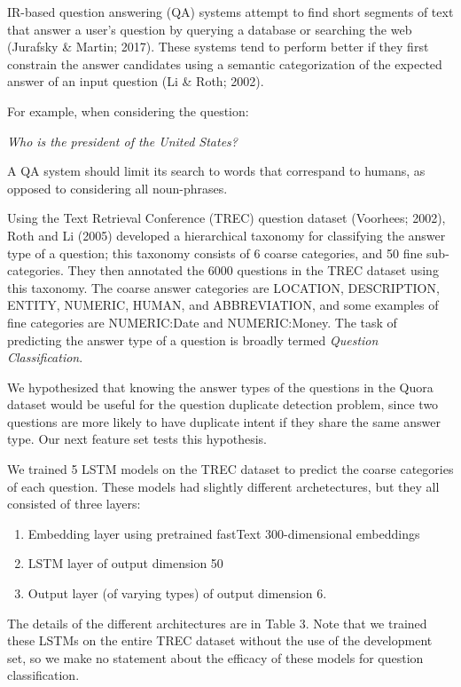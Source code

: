 \documentclass[letterpaper, 10 pt, conference]{ieeeconf}  %
\begin{document}
IR-based question answering (QA) systems attempt to find short segments of text that answer a user’s question by querying a database or searching the web (Jurafsky \& Martin; 2017). These systems tend to perform better if they first constrain the answer candidates using a semantic categorization of the expected answer of an input question (Li \& Roth; 2002).  

For example, when considering the question:
\begin{center}
\emph{Who is the president of the United States?}
\end{center}
A QA system should limit its search to words that correspand to humans, as opposed to considering all noun-phrases.

Using the Text Retrieval Conference (TREC) question dataset (Voorhees; 2002), Roth and Li (2005) developed a hierarchical taxonomy for classifying the answer type of a question; this taxonomy consists of 6 coarse categories, and 50 fine sub-categories. They then annotated the 6000 questions in the TREC dataset using this taxonomy. The coarse answer categories are LOCATION, DESCRIPTION, ENTITY, NUMERIC, HUMAN, and ABBREVIATION, and some examples of fine categories are NUMERIC:Date and NUMERIC:Money. The task of predicting the answer type of a question is broadly termed \emph{Question Classification}. 

We hypothesized that knowing the answer types of the questions in the Quora dataset would be useful for the question duplicate detection problem, since two questions are more likely to have duplicate intent if they share the same answer type. Our next feature set tests this hypothesis. 

We trained 5 LSTM models on the TREC dataset to predict the coarse categories of each question. These models had slightly different archetectures, but they all consisted of three layers:
\begin{enumerate}
\item Embedding layer using pretrained fastText 300-dimensional embeddings
\item LSTM layer of output dimension 50
\item Output layer (of varying types) of output dimension 6.
\end{enumerate}
The details of the different architectures are in Table 3. Note that we trained these LSTMs on the entire TREC dataset without the use of the development set,  so we make no statement about the efficacy of these models for question classification.
\end{document}
